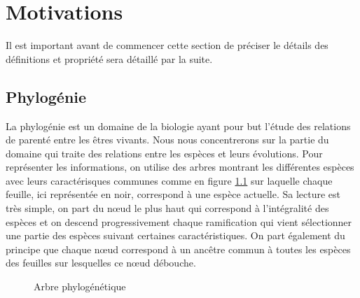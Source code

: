 \chapter{Motivations}

Il est important avant de commencer cette section de préciser le détails des définitions et propriété sera détaillé par la suite.

\section{Phylogénie}

La phylogénie est un domaine de la biologie ayant pour but l'étude des relations de parenté entre les êtres vivants. Nous nous concentrerons sur la partie du domaine qui traite des relations entre les espèces et leurs évolutions. Pour représenter les informations, on utilise des arbres montrant les différentes espèces avec leurs caractérisques communes comme en figure \ref{arbre_phylogenie} sur laquelle chaque feuille, ici représentée en noir, correspond à une espèce actuelle. Sa lecture est très simple, on part du n\oe ud le plus haut qui correspond à l'intégralité des espèces et on descend progressivement chaque ramification qui vient sélectionner une partie des espèces suivant certaines caractéristiques. On part également du principe que chaque n\oe ud correspond à un ancêtre commun à toutes les espèces des feuilles sur lesquelles ce n\oe ud débouche.

\begin{figure}[H]
	\begin{center}
	\end{center}
	\caption{Arbre phylogénétique}
	\label{arbre_phylogenie}
\end{figure}

